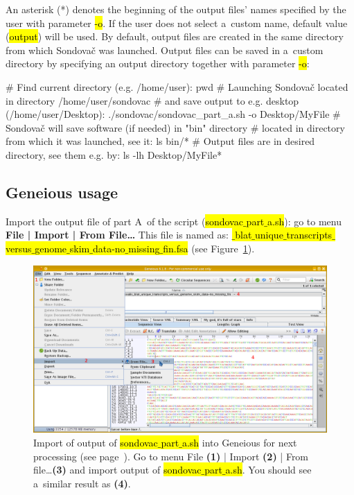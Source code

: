 \documentclass[a4paper, 11pt, twoside]{article}
\renewcommand{\texttt}[1]{\hl{\ttfamily #1}}
\begin{document}
An asterisk (*) denotes the beginning of the output files' names specified by the user with parameter \texttt{-o}. If the user does not select a~custom name, default value (\texttt{output}) will be used. By default, output files are created in the same directory from which Sondovač was launched. Output files can be saved in a~custom directory by specifying an output directory together with parameter \texttt{-o}:

\begin{bashcode}
  # Find current directory (e.g. /home/user):
  pwd
  # Launching Sondovač located in directory /home/user/sondovac
  # and save output to e.g. desktop (/home/user/Desktop):
  ./sondovac/sondovac_part_a.sh -o Desktop/MyFile
  # Sondovač will save software (if needed) in "bin" directory
  # located in directory from which it was launched, see it:
  ls bin/*
  # Output files are in desired directory, see them e.g. by:
  ls -lh Desktop/MyFile*
\end{bashcode}

\subsection{Geneious usage}
\label{geneious-usage}

Import the output file of part A~of the script (\texttt{sondovac$\_$part$\_$a.sh}): go to menu \textbf{File | Import | From File\ldots} This file is named as: \texttt{*$\_$blat$\_$unique$\_$transcripts$\_$versus$\_$genome$\_$skim$\_$data\--no$\_$missing$\_$fin.fsa} (see Figure~\ref{geneious-import}).

\begin{figure}[hbt]
  \includegraphics[width=\textwidth]{geneious1.png}
  \caption[Import into Geneious]{Import of output of \texttt{sondovac$\_$part$\_$a.sh} into Geneious for next processing (see page~\pageref{pipeline-overview}). Go to menu File \textbf{(1)} | Import \textbf{(2)} | From file\ldots \textbf{(3)} and import output of \texttt{sondovac$\_$part$\_$a.sh}. You should see a~similar result as \textbf{(4)}.}
  \label{geneious-import}
\end{figure}
\end{document}
